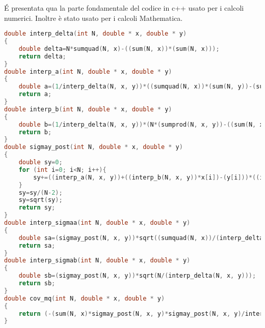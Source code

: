 \'E presentata qua la parte fondamentale del codice in c++ usato per i calcoli numerici. Inoltre è stato usato per i calcoli Mathematica.

\begin{lstlisting}[language=C++]
double interp_delta(int N, double * x, double * y)
{
	double delta=N*sumquad(N, x)-((sum(N, x))*(sum(N, x)));
	return delta;
}
double interp_a(int N, double * x, double * y)
{
	double a=(1/interp_delta(N, x, y))*((sumquad(N, x))*(sum(N, y))-(sum(N, x))*(sumprod (N, x, y)));
	return a;
}
double interp_b(int N, double * x, double * y)
{
	double b=(1/interp_delta(N, x, y))*(N*(sumprod(N, x, y))-((sum(N, x))*(sum(N, y))));
	return b;
}
double sigmay_post(int N, double * x, double * y)
{
	double sy=0;
	for (int i=0; i<N; i++){
		sy+=((interp_a(N, x, y))+((interp_b(N, x, y))*x[i])-(y[i]))*((interp_a(N, x, y))+((interp_b(N, x, y))*x[i])-(y[i]));
	}
	sy=sy/(N-2);
	sy=sqrt(sy);
	return sy;
}
double interp_sigmaa(int N, double * x, double * y)
{
	double sa=(sigmay_post(N, x, y))*sqrt((sumquad(N, x))/(interp_delta(N, x, y)));
	return sa;
}
double interp_sigmab(int N, double * x, double * y)
{
	double sb=(sigmay_post(N, x, y))*sqrt(N/(interp_delta(N, x, y)));
	return sb;
}
double cov_mq(int N, double * x, double * y)
{
	return (-(sum(N, x)*sigmay_post(N, x, y)*sigmay_post(N, x, y)/interp_delta(N, x, y)));
}
\end{lstlisting}
